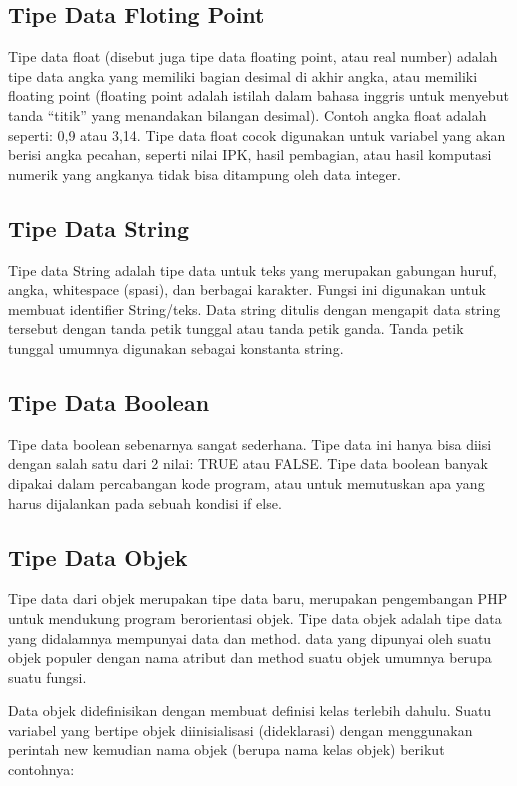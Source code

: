 \subsection{Tipe Data Floting Point}
Tipe data float (disebut juga tipe data floating point, atau real number) adalah tipe data angka yang memiliki bagian desimal di akhir angka, atau memiliki floating point (floating point adalah istilah dalam bahasa inggris untuk menyebut tanda “titik” yang menandakan bilangan desimal). Contoh angka float adalah seperti: 0,9 atau 3,14. Tipe data float cocok digunakan untuk variabel yang akan berisi angka pecahan, seperti nilai IPK, hasil pembagian, atau hasil komputasi numerik yang angkanya tidak bisa ditampung oleh data integer.
\subsection{Tipe Data String}
Tipe data String adalah tipe data untuk teks yang merupakan gabungan huruf, angka, whitespace (spasi), dan berbagai karakter. Fungsi ini digunakan untuk membuat identifier String/teks. Data string ditulis dengan mengapit data string tersebut dengan tanda petik tunggal atau tanda petik ganda. Tanda petik tunggal umumnya digunakan sebagai konstanta string.
\subsection{Tipe Data Boolean}
Tipe data boolean sebenarnya sangat sederhana. Tipe data ini hanya bisa diisi dengan salah satu dari 2 nilai: TRUE atau FALSE. Tipe data boolean banyak dipakai dalam percabangan kode program, atau untuk memutuskan apa yang harus dijalankan pada sebuah kondisi if else.
\subsection{Tipe Data Objek}
Tipe data dari objek merupakan tipe data baru, merupakan pengembangan PHP untuk mendukung program berorientasi objek. Tipe data objek adalah tipe data yang didalamnya mempunyai data dan method. data yang dipunyai oleh suatu objek populer dengan nama atribut dan method suatu objek umumnya berupa suatu fungsi. 

Data objek didefinisikan dengan membuat definisi kelas terlebih dahulu. Suatu variabel yang bertipe objek diinisialisasi (dideklarasi) dengan menggunakan perintah new kemudian nama objek (berupa nama kelas objek) berikut contohnya:



